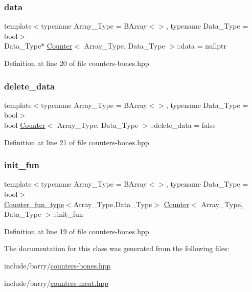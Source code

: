 \subsubsection{\texorpdfstring{data}{data}}
{\footnotesize\ttfamily template$<$typename Array\+\_\+\+Type = B\+Array$<$$>$, typename Data\+\_\+\+Type = bool$>$ \\
Data\+\_\+\+Type$\ast$ \hyperlink{class_counter}{Counter}$<$ Array\+\_\+\+Type, Data\+\_\+\+Type $>$\+::data = nullptr}



Definition at line 20 of file counters-\/bones.\+hpp.

\mbox{\label{class_counter_a5190fbe81aac2426ac36c0a088e242e7}} 
\subsubsection{\texorpdfstring{delete\+\_\+data}{delete\_data}}
{\footnotesize\ttfamily template$<$typename Array\+\_\+\+Type = B\+Array$<$$>$, typename Data\+\_\+\+Type = bool$>$ \\
bool \hyperlink{class_counter}{Counter}$<$ Array\+\_\+\+Type, Data\+\_\+\+Type $>$\+::delete\+\_\+data = false}



Definition at line 21 of file counters-\/bones.\+hpp.

\mbox{\label{class_counter_abb4e0b67e6489d438918495651baa5a8}} 
\subsubsection{\texorpdfstring{init\+\_\+fun}{init\_fun}}
{\footnotesize\ttfamily template$<$typename Array\+\_\+\+Type = B\+Array$<$$>$, typename Data\+\_\+\+Type = bool$>$ \\
\hyperlink{typedefs_8hpp_ac0160f52f564dea3ac033b374cffbfe7}{Counter\+\_\+fun\+\_\+type}$<$Array\+\_\+\+Type,Data\+\_\+\+Type$>$ \hyperlink{class_counter}{Counter}$<$ Array\+\_\+\+Type, Data\+\_\+\+Type $>$\+::init\+\_\+fun}



Definition at line 19 of file counters-\/bones.\+hpp.



The documentation for this class was generated from the following files\+:\begin{DoxyCompactItemize}
\item 
include/barry/\hyperlink{counters-bones_8hpp}{counters-\/bones.\+hpp}\item 
include/barry/\hyperlink{counters-meat_8hpp}{counters-\/meat.\+hpp}\end{DoxyCompactItemize}
